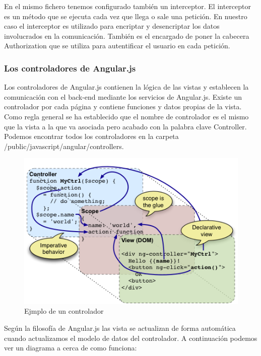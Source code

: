 En el mismo fichero tenemos configurado también un interceptor. El interceptor es un método que se ejecuta cada vez que llega o sale una petición. En nuestro caso el interceptor es utilizado para encriptar y desencriptar los datos involucrados en la comunicación. También es el encargado de poner la cabecera Authorization que se utiliza para autentificar el usuario en cada petición.

\subsubsection{Los controladores de Angular.js}

Los controladores de Angular.js contienen la lógica de las vistas y establecen la comunicación con el back-end mediante los servicios de Angular.js. Existe un controlador por cada página y contiene funciones y datos propias de la vista. Como regla general se ha establecido que el nombre de controlador es el mismo que la vista a la que va asociada pero acabado con la palabra clave Controller. Podemos encontrar todos los controladores en la carpeta /public/javascript/angular/controllers.  

\begin{figure}[H]
	\centering\includegraphics[scale=0.5]{imagenes/concepts-controller.png}
	\caption{Ejmplo de un controlador}
	\label{controllerExample}
\end{figure}

Según la filosofía de Angular.js las vista se actualizan de forma automática cuando actualizamos el modelo de datos del controlador. A continuación podemos ver un diagrama a cerca de como funciona:

